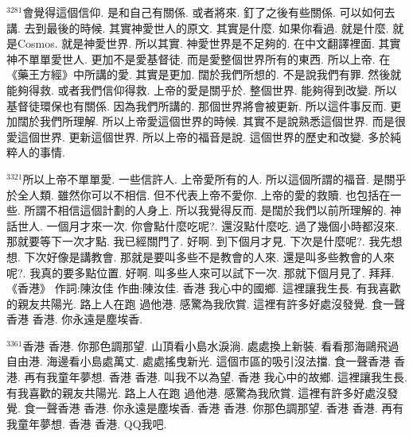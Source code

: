 \documentclass{book}
\begin{document}
$^{3281}$會覺得這個信仰.
是和自己有關係.
或者將來.
釘了之後有些關係.
可以如何去講.
去到最後的時候.
其實神愛世人的原文.
其實是什麼.
如果你看過.
就是什麼.
就是Cosmos.
就是神愛世界.
所以其實.
神愛世界是不足夠的.
在中文翻譯裡面.
其實神不單單愛世人.
更加不是愛基督徒.
而是愛整個世界所有的東西.
所以上帝.
在《藥王方經》中所講的愛.
其實是更加.
闊於我們所想的.
不是說我們有罪.
然後就能夠得救.
或者我們信仰得救.
上帝的愛是關乎於.
整個世界.
能夠得到改變.
所以基督徒環保也有關係.
因為我們所講的.
那個世界將會被更新.
所以這件事反而.
更加闊於我們所理解.
所以上帝愛這個世界的時候.
其實不是說熟悉這個世界.
而是很愛這個世界.
更新這個世界.
所以上帝的福音是說.
這個世界的歷史和改變.
多於純粹人的事情.

$^{3321}$所以上帝不單單愛.
一些信許人.
上帝愛所有的人.
所以這個所謂的福音.
是關乎於全人類.
雖然你可以不相信.
但不代表上帝不愛你.
上帝的愛的救贖.
也包括在一些.
所謂不相信這個計劃的人身上.
所以我覺得反而.
是闊於我們以前所理解的.
神話世人.
一個月才來一次.
你會點什麼吃呢?.
還沒點什麼吃.
過了幾個小時都沒來.
那就要等下一次才點.
我已經關門了.
好啊.
到下個月才見.
下次是什麼呢?.
我先想想.
下次好像是講教會.
那就是要叫多些不是教會的人來.
還是叫多些教會的人來呢?.
我真的要多點位置.
好啊.
叫多些人來可以試下一次.
那就下個月見了.
拜拜.
《香港》 作詞:陳汝佳 作曲:陳汝佳.
香港 我心中的國鄉.
這裡讓我生長.
有我喜歡的親友共陽光.
路上人在跑 過他港.
感驚為我欣賞.
這裡有許多好處沒發覺.
食一聲香港 香港.
你永遠是塵埃香.

$^{3361}$香港 香港.
你那色調那望.
山頂看小島水淚淌.
處處換上新裝.
看看那海鷗飛過自由港.
海邊看小島處萬丈.
處處搖曳新光.
這個市區的吸引沒法擋.
食一聲香港 香港.
再有我童年夢想.
香港 香港.
叫我不以為望.
香港 我心中的故鄉.
這裡讓我生長.
有我喜歡的親友共陽光.
路上人在跑 過他港.
感驚為我欣賞.
這裡有許多好處沒發覺.
食一聲香港 香港.
你永遠是塵埃香.
香港 香港.
你那色調那望.
香港 香港.
再有我童年夢想.
香港 香港.
QQ我吧.
\newpage
\end{document}
